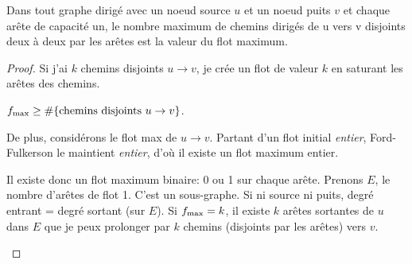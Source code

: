 \begin{mylem}
  \label{lem:flot_chemin}
  Dans tout graphe dirigé avec un noeud source $u$ et un noeud puits $v$ et chaque arête de capacité un, le nombre maximum de chemins dirigés de u vers v disjoints deux à deux par les arêtes est la valeur du flot maximum.
  \begin{proof}
    Si j'ai $k$ chemins disjoints $u \to v$,
    je crée un flot de valeur $k$ en saturant les arêtes
    des chemins.
    \begin{figure}[!h]
      \centering
    \end{figure}
    $f_\mathrm{max} \geq \#\{\text{chemins disjoints }u \to v\}$.

    De plus, considérons le flot max de $u \to v$.
    Partant d'un flot initial \emph{entier},
    Ford-Fulkerson le maintient \emph{entier},
    d'où il existe un flot maximum entier.

    Il existe donc un flot maximum binaire: 0 ou 1
    sur chaque arête.
    Prenons $E$, le nombre d'arêtes de flot 1.
    C'est un sous-graphe.
    Si ni source ni puits,
    degré entrant = degré sortant (sur $E$).
    Si $f_\mathrm{max} = k$,
    il existe $k$ arêtes sortantes de $u$ dans $E$ que
    je peux prolonger par $k$ chemins (disjoints par les arêtes)
    vers $v$.

    \begin{figure}[!h]
      \centering
    \end{figure}
  \end{proof}
\end{mylem}

